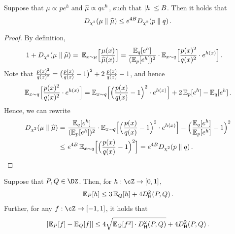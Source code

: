\begin{lemma}\label{lem:Dchis-perturb}
Suppose that $\mu\propto pe^{h}$ and $\muhat\propto qe^{h}$, such that $\abs{h}\leq B$. Then it holds that
\begin{align*}
    \Dchis{\mu}{\muhat}\leq e^{4B}\Dchis{p}{q}\,.
\end{align*} 
\end{lemma}
\begin{proof}
By definition,
\begin{align*}
    1+\Dchis{\mu}{\muhat}
    =&~ \En_{x\sim \mu}\brk[\Big]{\frac{\mu(x)}{\muhat(x)}}
    =\frac{\En_q[e^h]}{(\En_p[e^h])^2}\cdot \En_{x\sim q}\brk[\Big]{ \frac{p(x)^2}{q(x)^2}\cdot e^{h(x)} }\,.
\end{align*}
Note that $\frac{p(x)^2}{q(x)^2}=\prn[\big]{\frac{p(x)}{q(x)}-1}^2+2\,\frac{p(x)}{q(x)}-1$, and hence
\begin{align*}
    \En_{x\sim q}\brk[\Big]{ \frac{p(x)^2}{q(x)^2}\cdot e^{h(x)} }
    =\En_{x\sim q}\brk[\Big]{ \prn[\Big]{\frac{p(x)}{q(x)}-1}^2 \cdot e^{h(x)} }+2\En_p[e^h]-\En_q[e^h]\,.
\end{align*}
Hence, we can rewrite
\begin{align*}
    \Dchis{\mu}{\muhat}
    =&~
    \frac{\En_q[e^h]}{(\En_p[e^h])^2}\cdot \En_{x\sim q}\brk[\Big]{ \prn[\Big]{\frac{p(x)}{q(x)}-1}^2 \cdot e^{h(x)} } - \prn[\Big]{\frac{\En_q[e^h]}{\En_p[e^h]}-1}^2 \\
    \leq&~ e^{4B}\En_{x\sim q}\brk[\Big]{ \prn[\Big]{\frac{p(x)}{q(x)}-1}^2  }
    =e^{4B}\Dchis{p}{q}\,.
\end{align*}
\end{proof}

\begin{lemma}\label{lem:Hels-var}
Suppose that $P,Q\in\DZ$. Then, for $h:\cZ\to[0,1]$,
\begin{align*}
    \En_P[h]\leq 3\En_Q[h]+4\Dhels{P}{Q}\,.
\end{align*}
Further, for any $f:\cZ\to [-1,1]$, it holds that
\begin{align*}
    \abs{\En_P[f]-\En_Q[f]}\leq 4\sqrt{\En_Q[f^2]\cdot \Dhels{P}{Q}}+4\Dhels{P}{Q}\,.
\end{align*}
\end{lemma}

